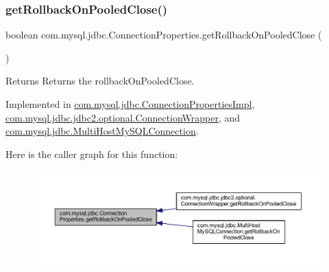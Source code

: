 \subsubsection{\texorpdfstring{get\+Rollback\+On\+Pooled\+Close()}{getRollbackOnPooledClose()}}
{\footnotesize\ttfamily boolean com.\+mysql.\+jdbc.\+Connection\+Properties.\+get\+Rollback\+On\+Pooled\+Close (\begin{DoxyParamCaption}{ }\end{DoxyParamCaption})}

\begin{DoxyReturn}{Returns}
Returns the rollback\+On\+Pooled\+Close. 
\end{DoxyReturn}


Implemented in \mbox{\hyperlink{classcom_1_1mysql_1_1jdbc_1_1_connection_properties_impl_a0fae8f273bff1dfd51555b3b130cef9a}{com.\+mysql.\+jdbc.\+Connection\+Properties\+Impl}}, \mbox{\hyperlink{classcom_1_1mysql_1_1jdbc_1_1jdbc2_1_1optional_1_1_connection_wrapper_ada2984ed24a32bb5d13aff48689757d9}{com.\+mysql.\+jdbc.\+jdbc2.\+optional.\+Connection\+Wrapper}}, and \mbox{\hyperlink{classcom_1_1mysql_1_1jdbc_1_1_multi_host_my_s_q_l_connection_a6e4539fdcc9a9aaa023d2902f1fbb1ef}{com.\+mysql.\+jdbc.\+Multi\+Host\+My\+S\+Q\+L\+Connection}}.

Here is the caller graph for this function\+:\nopagebreak
\begin{figure}[H]
\begin{center}
\leavevmode
\includegraphics[width=350pt]{interfacecom_1_1mysql_1_1jdbc_1_1_connection_properties_a8b670aa700956797a853c145974cd285_icgraph}
\end{center}
\end{figure}
\mbox{\label{interfacecom_1_1mysql_1_1jdbc_1_1_connection_properties_a48b88c077dbb42077a1fb257aab4558f}} 
